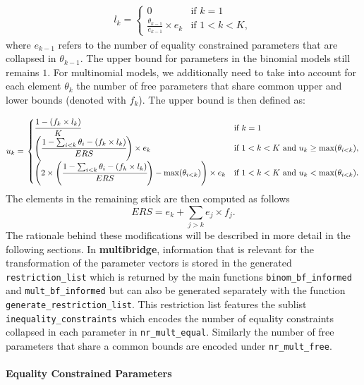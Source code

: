 \begin{appendix}
\begin{align}
  l_k = \left.
  \begin{cases}
      0 & \text{if } k = 1 \\
      \frac{\theta_{k - 1}}{e_{k-1}} \times e_k & \text{if } 1 < k < K,
  \end{cases}
    \right.
\end{align} where \(e_{k-1}\) refers to the number of equality
constrained parameters that are collapsed in \(\theta_{k - 1}\). The
upper bound for parameters in the binomial models still remains \(1\).
For multinomial models, we additionally need to take into account for
each element \(\theta_k\) the number of free parameters that share
common upper and lower bounds (denoted with \(f_k\)). The upper bound is
then defined as:

\begin{align}
  u_k = \left.
  \begin{cases}
      \cfrac{1 - (f_k \times l_k)}{K} & \text{if } k = 1 \\
     \left( \cfrac{1 - \sum_{i < k} \theta_i - (f_k \times l_k)}{ERS} \right) \times e_k & \text{if } 1 < k < K \text{ and } u_k \geq \text{max}(\theta_{i < k}), \\
    \left( 2 \times \left( \cfrac{1 - \sum_{i < k} \theta_i - (f_k \times l_k)}{ERS} \right) - \text{max}(\theta_{i < k}) \right)  \times e_k & \text{if } 1 < k < K \text{ and } u_k < \text{max}(\theta_{i < k}).
  \end{cases}
    \right.
\end{align} The elements in the remaining stick are then computed as
follows \[ERS = e_k + \sum_{j > k} e_j \times f_j.\] The rationale
behind these modifications will be described in more detail in the
following sections. In \textbf{multibridge}, information that is
relevant for the transformation of the parameter vectors is stored in
the generated \texttt{restriction\_list} which is returned by the main
functions \texttt{binom\_bf\_informed} and \texttt{mult\_bf\_informed}
but can also be generated separately with the function
\texttt{generate\_restriction\_list}. This restriction list features the
sublist \texttt{inequality\_constraints} which encodes the number of
equality constraints collapsed in each parameter in
\texttt{nr\_mult\_equal}. Similarly the number of free parameters that
share a common bounds are encoded under \texttt{nr\_mult\_free}.

\hypertarget{equality-constrained-parameters}{%
\paragraph{Equality Constrained
Parameters}\label{equality-constrained-parameters}}


\end{appendix}

